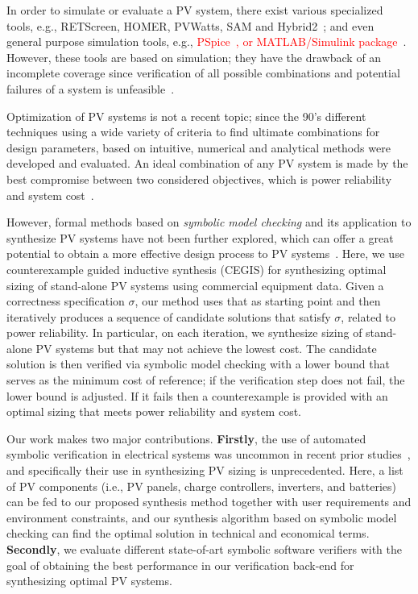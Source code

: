 \documentclass[review]{elsarticle}
\begin{document}
In order to simulate or evaluate a PV system, there exist various specialized tools, 
e.g., RETScreen, HOMER, PVWatts, SAM and Hybrid2~\cite{Pradhan,Swarnkar,NRELDobos,NRELBlair,Mills}; 
and even general purpose simulation tools, e.g., \textcolor{red} {PSpice~\cite{Gow1999},  
or MATLAB/Simulink package~\cite{Benatiallah2017}}. However, these tools are based on simulation; 
they have the drawback of an incomplete coverage  since verification of all possible 
combinations and potential failures of a system is unfeasible~\cite{ClarkeHV18}. 

Optimization of PV systems is not a recent topic; since the 90's different techniques 
using a wide variety of criteria to find ultimate combinations for design parameters, 
based on intuitive, numerical and analytical methods were developed and evaluated. 
An ideal combination of any PV system is made by the best compromise between 
two considered objectives, which is power reliability and system cost~\cite{Alsadi2018}.
 
However, formal methods based on \textit{symbolic model checking} and its application 
to synthesize PV systems have not been further explored, which can offer a great potential 
to obtain a more effective design process to PV systems~\cite{ClarkeHV18}. 
Here, we use counterexample guided inductive synthesis (CEGIS) for synthesizing 
optimal sizing of stand-alone PV systems using commercial equipment data. 
Given a correctness specification $\sigma$, our method uses that as starting point 
and then iteratively produces a sequence of candidate solutions that satisfy $\sigma$, 
related to power reliability. In particular, on each iteration, we synthesize sizing of 
stand-alone PV systems but that may not achieve the lowest cost. The candidate solution 
is then verified via symbolic model checking with a lower bound that serves as the minimum 
cost of reference; if the verification step does not fail, the lower bound is adjusted. 
If it fails then a counterexample is provided with an optimal sizing that meets 
power reliability and system cost.

Our work makes two major contributions. \textbf{Firstly}, the use of automated 
symbolic verification in electrical systems was uncommon in recent 
prior studies~\cite{abs-1811-09438}, and specifically their use in synthesizing 
PV sizing is unprecedented. Here, a list of PV components (i.e., PV panels, 
charge controllers, inverters, and batteries) can be fed to our proposed synthesis 
method together with user requirements and environment constraints, 
and our synthesis algorithm based on symbolic model checking 
can find the optimal solution in technical and economical terms. 
\textbf{Secondly}, we evaluate different state-of-art symbolic software 
verifiers with the goal of obtaining the best performance in our verification 
back-end for synthesizing optimal PV systems.
\end{document}
